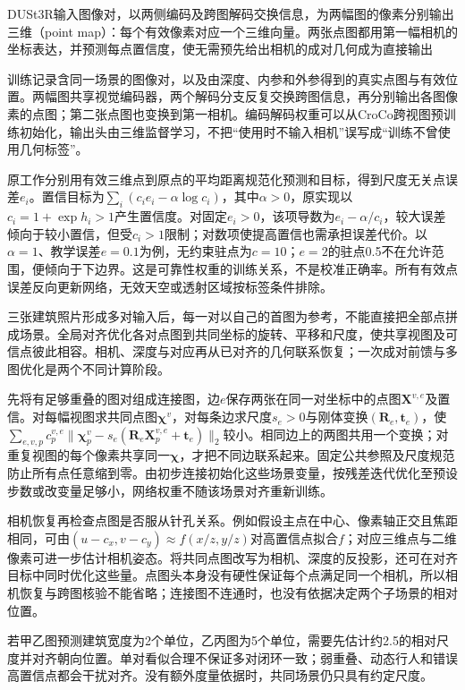 DUSt3R输入图像对，以两侧编码及跨图解码交换信息，为两幅图的像素分别输出三维（point map）：每个有效像素对应一个三维向量。两张点图都用第一幅相机的坐标表达，并预测每点置信度，使无需预先给出相机的成对几何成为直接输出

训练记录含同一场景的图像对，以及由深度、内参和外参得到的真实点图与有效位置。两幅图共享视觉编码器，两个解码分支反复交换跨图信息，再分别输出各图像素的点图；第二张点图也变换到第一相机。编码解码权重可以从CroCo跨视图预训练初始化，输出头由三维监督学习，不把“使用时不输入相机”误写成“训练不曾使用几何标签”。

原工作分别用有效三维点到原点的平均距离规范化预测和目标，得到尺度无关点误差$e_i$。置信目标为$\sum_i(c_i e_i-\alpha\log c_i)$，其中$\alpha>0$，原实现以$c_i=1+\exp h_i>1$产生置信度。对固定$e_i>0$，该项导数为$e_i-\alpha/c_i$，较大误差倾向于较小置信，但受$c_i>1$限制；对数项使提高置信也需承担误差代价。以$\alpha=1$、教学误差$e=0.1$为例，无约束驻点为$c=10$；$e=2$的驻点0.5不在允许范围，便倾向于下边界。这是可靠性权重的训练关系，不是校准正确率。所有有效点误差反向更新网络，无效天空或透射区域按标签条件排除。

三张建筑照片形成多对输入后，每一对以自己的首图为参考，不能直接把全部点拼成场景。全局对齐优化各对点图到共同坐标的旋转、平移和尺度，使共享视图及可信点彼此相容。相机、深度与对应再从已对齐的几何联系恢复；一次成对前馈与多图优化是两个不同计算阶段。

先将有足够重叠的图对组成连接图，边$e$保存两张在同一对坐标中的点图$\bm X^{v,e}$及置信。对每幅视图求共同点图$\bm\chi^v$，对每条边求尺度$s_e>0$与刚体变换$(\bm R_e,\bm t_e)$，使$\sum_{e,v,p}c_p^{v,e}\lVert\bm\chi_p^v-s_e(\bm R_e\bm X_p^{v,e}+\bm t_e)\rVert_2$较小。相同边上的两图共用一个变换；对重复视图的每个像素共享同一$\bm\chi$，才把不同边联系起来。固定公共参照及尺度规范防止所有点任意缩到零。由初步连接初始化这些场景变量，按残差迭代优化至预设步数或改变量足够小，网络权重不随该场景对齐重新训练。

相机恢复再检查点图是否服从针孔关系。例如假设主点在中心、像素轴正交且焦距相同，可由$(u-c_x,v-c_y)\approx f(x/z,y/z)$对高置信点拟合$f$；对应三维点与二维像素可进一步估计相机姿态。将共同点图改写为相机、深度的反投影，还可在对齐目标中同时优化这些量。点图头本身没有硬性保证每个点满足同一个相机，所以相机恢复与跨图核验不能省略；连接图不连通时，也没有依据决定两个子场景的相对位置。

若甲乙图预测建筑宽度为2个单位，乙丙图为5个单位，需要先估计约2.5的相对尺度并对齐朝向位置。单对看似合理不保证多对闭环一致；弱重叠、动态行人和错误高置信点都会干扰对齐。没有额外度量依据时，共同场景仍只具有约定尺度。

